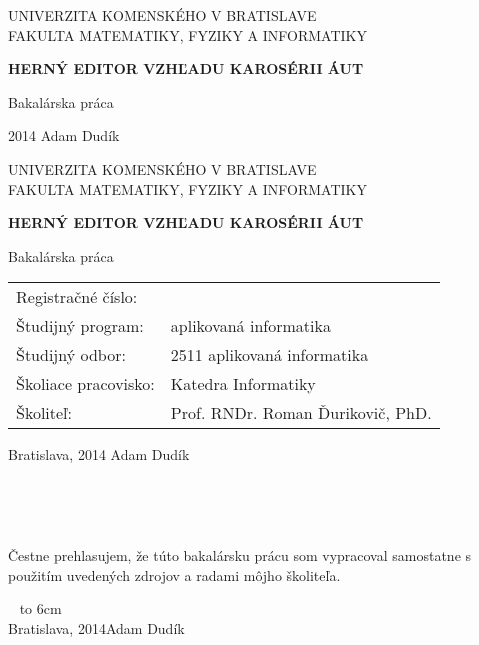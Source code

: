 \documentclass[12pt,a4paper,oneside]{bachelor} %
\def\mftitle{Herný editor vzhľadu karosérii áut}
\def\mfthesistype{Bakalárska práca}
\def\mfauthor{Adam Dudík}
\def\mfadvisor{Prof. RNDr. Roman Ďurikovič, PhD.}
\def\mfplacedate{Bratislava, 2014}
\begin{document}

\thispagestyle{empty}

\noindent
\begin{minipage}{\textwidth}
\begin{center}
\uppercase{Univerzita Komenského v Bratislave \\
Fakulta matematiky, fyziky a informatiky}
\end{center}
\end{minipage}

\vfill
\begin{center}
\begin{minipage}{0.8\textwidth}
\centerline{\textbf{\LARGE\MakeUppercase{\mftitle}}}
\smallskip
\centerline{\mfthesistype}
\end{minipage}
\end{center}
\vfill
2014 \hfill
\mfauthor
\eject 

\thispagestyle{empty}

\begin{minipage}{\textwidth}
\begin{center}
\uppercase{Univerzita Komenského v Bratislave \\
Fakulta matematiky, fyziky a informatiky}
\end{center}
\end{minipage}

\vfill
\begin{center}
\begin{minipage}{0.8\textwidth}
\centerline{\textbf{\MakeUppercase{\mftitle}}}
\smallskip
\centerline{\mfthesistype}
\end{minipage}
\end{center}
\vfill
\begin{tabular}{l l}
Registračné číslo: &  \\
Študijný program: & aplikovaná informatika\\
Študijný odbor: & 2511 aplikovaná informatika\\
Školiace pracovisko: & Katedra Informatiky\\
Školiteľ: & \mfadvisor
\end{tabular}
\vfill
\mfplacedate \hfill
\mfauthor
\eject 

\thispagestyle{empty}

{~}\vspace{12cm}

\noindent
\begin{minipage}{0.25\textwidth}~\end{minipage}
\begin{minipage}{0.75\textwidth}
Čestne prehlasujem, že túto bakalársku prácu som vypracoval samostatne s použitím uvedených zdrojov a radami môjho školiteľa.
\newline \newline
\end{minipage}
\vfill
~ \hfill {\hbox to 6cm{\dotfill}} \\
\mfplacedate \hfill Adam Dudík
\vfill\eject 
\end{document}
